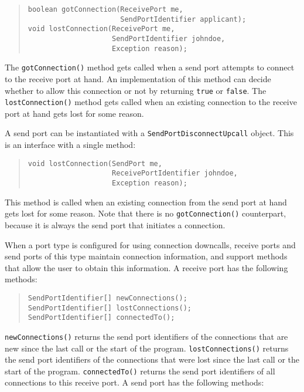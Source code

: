 \documentclass[10pt]{article}
\begin{document}
{\small
\begin{quote}
\begin{verbatim}
boolean gotConnection(ReceivePort me,
                      SendPortIdentifier applicant);
void lostConnection(ReceivePort me,
                    SendPortIdentifier johndoe,
                    Exception reason);
\end{verbatim}
\end{quote}
}
\noindent 
The \texttt{gotConnection()} method gets called when a send port attempts
to connect to the receive port at hand.
An implementation of this method can decide whether
to allow this connection or not by returning \texttt{true} or \texttt{false}.
The \texttt{lostConnection()} method gets called when an existing connection
to the receive port at hand gets lost for some reason.

A send port can be instantiated with a
\texttt{SendPortDisconnectUpcall} object.
This is an interface with a single method:

{\small
\begin{quote}
\begin{verbatim}
void lostConnection(SendPort me,
                    ReceivePortIdentifier johndoe,
                    Exception reason);
\end{verbatim}
\end{quote}
}
\noindent 
This method is called when an existing connection from the send port at
hand gets lost for some reason. Note that there is no \texttt{gotConnection()}
counterpart, because it is always the send port that initiates a connection.

When a port type is configured for using connection downcalls, receive ports
and send ports of this type maintain connection information, and support
methods that allow the user to obtain this information.
A receive port has the following methods:

{\small
\begin{quote}
\begin{verbatim}
SendPortIdentifier[] newConnections();
SendPortIdentifier[] lostConnections();
SendPortIdentifier[] connectedTo();
\end{verbatim}
\end{quote}
}

\texttt{newConnections()} returns the send port identifiers of the connections
that are new since the last call or the start of the program.
\texttt{lostConnections()} returns the send port identifiers of the connections
that were lost since the last call or the start of the program.
\texttt{connectedTo()} returns the send port identifiers of all connections
to this receive port.
A send port has the following methods:
\end{document}
